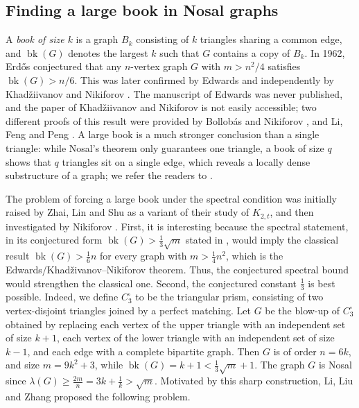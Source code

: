 \documentclass[11pt,a4paper]{article}
\theoremstyle{definition}
\theoremstyle{plain}
\newcommand{\bk}{\operatorname{bk}}
\renewcommand{\ge}{\geqslant}
\begin{document}
\subsection{Finding a large book in Nosal graphs}

A \emph{book of size $k$} is a graph $B_k$ consisting of $k$ triangles sharing a common edge, and $\bk(G)$ denotes the largest $k$ such that $G$ contains a copy of $B_k$. 
In 1962, Erd\H{o}s \cite{Erd1962} conjectured that any $n$-vertex graph $G$ with $m>n^2/4$ satisfies \( \bk (G) >  n/6 \). 
This was later confirmed by Edwards \cite{Edw1977} and independently by Khad\v{z}iivanov and Nikiforov  \cite{KN1979}. 
The manuscript of Edwards was never published, and the paper of Khad\v{z}iivanov and Nikiforov is not easily accessible;  
two different proofs of this result were  provided by Bollob\'{a}s and Nikiforov \cite{BN05}, and  Li, Feng and Peng \cite{LFP2024-triangular}. 
A large book is a much stronger conclusion than a single triangle: while Nosal's theorem only
guarantees one triangle, a book of size $q$ shows that $q$ triangles sit on a single
edge, which reveals a locally dense substructure of a graph; we refer the readers to \cite{Mubayi2012,CFS2020,ZL2022jgt,LiuMiao2025,MiaoLiuDam2026}. 

\smallskip  
The problem of forcing a large book under the spectral condition was initially raised by Zhai, Lin and Shu \cite{ZLS2021} as a variant of their study of  $K_{2,t}$, and then investigated by Nikiforov \cite{Nikiforov21}.  
First, it is interesting because the spectral statement, in its conjectured form $\bk (G)> \frac13\sqrt{m}$ stated in \cite{LiLiuZhang26}, 
would imply the classical result $\bk(G)>\frac16 n$ for every graph with $m>\frac{1}{4} n^2$, 
which is the Edwards/Khad\v{z}ivanov--Nikiforov theorem. Thus, the conjectured spectral bound would strengthen the classical one. 
Second, the conjectured constant $\frac13$ is best possible. Indeed, we define $C_3^{\square}$ to be the triangular prism, consisting of two vertex-disjoint triangles joined by a perfect matching. Let $G$ be the blow-up of $C_3^{\square}$ obtained by replacing each vertex of the upper triangle with an independent set of size $k+1$, each vertex of the lower triangle with an independent set of size $k-1$,
and each edge with a complete bipartite graph. Then $G$ is of order $n=6k$, and size $m=9k^2+3$, while $\bk(G)=k+1< \frac13\sqrt{m}+1$. The graph $G$ is 
Nosal since $\lambda (G)\ge \frac{2m}{n} =3k + \frac{1}{k} > \sqrt{m}$.  
Motivated by this sharp construction, Li, Liu
and Zhang \cite{LiLiuZhang26} proposed the following problem.
\end{document}
